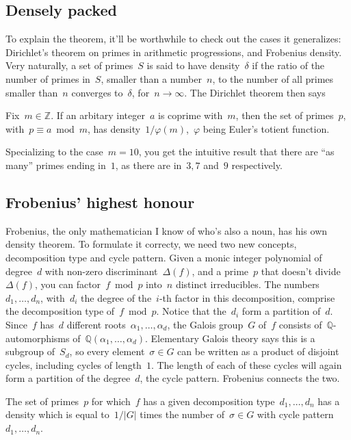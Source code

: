 \subsection{Densely packed}

To explain the theorem, it'll be worthwhile to check out the cases it generalizes: Dirichlet's theorem on primes in arithmetic progressions, and Frobenius density. Very naturally, a set of primes~$S$ is said to have density~$\delta$ if the ratio of the number of primes in~$S$, smaller than a number~$n$, to the number of all primes smaller than~$n$ converges to~$\delta$, for~$n \to \infty$. The Dirichlet theorem then says

\begin{theorem}
  Fix~$m \in \mathbb{Z}$. If an arbitary integer~$a$ is coprime with~$m$, then the set of primes~$p$, with~$p \equiv a\bmod m$, has density~$1/\varphi(m)$,~$\varphi$ being Euler's totient function.
\end{theorem}

Specializing to the case~$m=10$, you get the intuitive result that there are ``as many'' primes ending in~$1$, as there are in~$3, 7$ and~$9$ respectively.

\subsection{Frobenius' highest honour}

Frobenius, the only mathematician I know of who's also a noun, has his own density theorem. To formulate it correcty, we need two new concepts, decomposition type and cycle pattern. Given a monic integer polynomial of degree~$d$ with non-zero discriminant~$\Delta(f)$, and a prime~$p$ that doesn't divide~$\Delta(f)$, you can factor~$f\bmod p$ into~$n$ distinct irreducibles. The numbers $d_{1},\ldots,d_{n}$, with~$d_{i}$ the degree of the~$i$-th factor in this decomposition, comprise the decomposition type of~$f\bmod p$. Notice that the~$d_{i}$ form a partition of~$d$. Since~$f$ has~$d$ different roots~$\alpha_{1},\ldots,\alpha_{d}$, the Galois group~$G$ of~$f$ consists of~$\mathbb{Q}$-automorphisms of~$\mathbb{Q}(\alpha_{1},\ldots, \alpha_{d})$. Elementary Galois theory says this is a subgroup of~$S_{d}$, so every element~$\sigma \in G$ can be written as a product of disjoint cycles, including cycles of length~$1$. The length of each of these cycles will again form a partition of the degree~$d$, the cycle pattern. Frobenius connects the two.

\begin{theorem}
  The set of primes~$p$ for which~$f$ has a given decomposition type~$d_{1},\ldots,d_{n}$ has a density which is equal to~$1/\vert G \vert$ times the number of~$\sigma \in G$ with cycle pattern~$d_{1},\ldots,d_{n}$.
\end{theorem}


